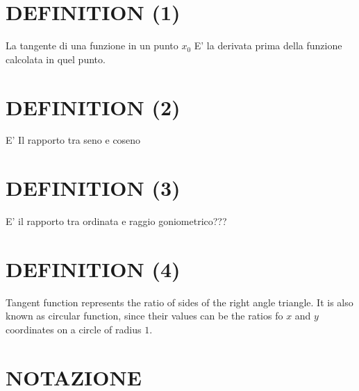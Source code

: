 \section{DEFINITION (1)}
La tangente di una funzione in un punto $x_0$ E' la derivata prima della funzione calcolata in quel punto.

\section{DEFINITION (2)}
E' Il rapporto tra seno e coseno

\section{DEFINITION (3)}
E' il rapporto tra ordinata e raggio goniometrico???

\section{DEFINITION (4)}
Tangent function represents the ratio of sides of the right angle triangle. It is also known as circular
function, since their values can be the ratios fo $x$ and $y$ coordinates on a circle of radius $1$.
\section{NOTAZIONE}

